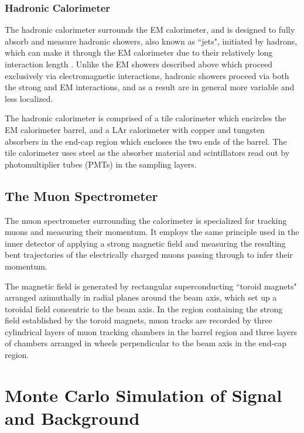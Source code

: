 \documentclass[12pt]{article}
\begin{document}
\subsubsection{Hadronic Calorimeter}

The hadronic calorimeter surrounds the EM calorimeter, and is designed to fully absorb and measure hadronic showers, also known as ``jets", initiated by hadrons, which can make it through the EM calorimeter due to their relatively long interaction length \cite{atlas}. Unlike the EM showers described above which proceed exclusively via electromagnetic interactions, hadronic showers proceed via both the strong and EM interactions, and as a result are in general more variable and less localized. 

The hadronic calorimeter is comprised of a tile calorimeter which encircles the EM calorimeter barrel, and a LAr calorimeter with copper and tungsten absorbers in the end-cap region which encloses the two ends of the barrel. The tile calorimeter uses steel as the absorber material and scintillators read out by photomultiplier tubes (PMTs) in the sampling layers. 

\subsection{The Muon Spectrometer}

The muon spectrometer \cite{atlas} surrounding the calorimeter is specialized for tracking muons and measuring their momentum. It employs the same principle used in the inner detector of applying a strong magnetic field and measuring the resulting bent trajectories of the electrically charged muons passing through to infer their momentum. 

The magnetic field is generated by rectangular superconducting ``toroid magnets" arranged azimuthally in radial planes around the beam axis, which set up a toroidal field concentric to the beam axis. In the region containing the strong field established by the toroid magnets, muon tracks are recorded by three cylindrical layers of muon tracking chambers in the barrel region and three layers of chambers arranged in wheels perpendicular to the beam axis in the end-cap region. 

\section{Monte Carlo Simulation of Signal and Background}
\end{document}

